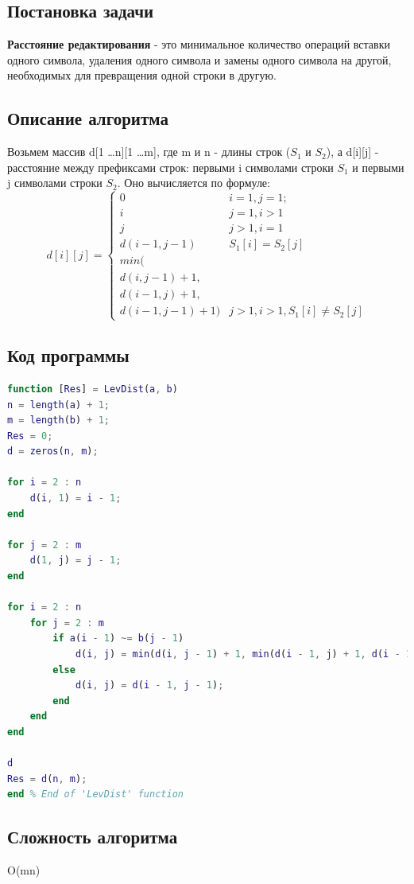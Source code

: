 \documentclass{article}
\begin{document}
\subsection{Постановка задачи}
\textbf{Расстояние редактирования} - это минимальное количество операций вставки одного символа, удаления одного символа и замены одного символа на другой, необходимых для превращения одной строки в другую.
\subsection{Описание алгоритма}
Возьмем массив d[1 \ldots n][1 \ldots m], где m и n - длины строк ($S_{1}$ и $S_{2}$), а d[i][j] - расстояние между префиксами строк: первыми i символами строки $S_{1}$ и первыми j символами строки $S_{2}$. Оно вычисляется по формуле:
\begin{equation}
d[i][j] = 
\begin{cases}
0 & i = 1, j = 1;\\
i & j = 1, i > 1\\
j & j > 1, i = 1\\
d(i - 1, j - 1) & S_{1}[i] = S_{2}[j]\\
min(\\d(i, j - 1) + 1,\\ d(i - 1, j) + 1,\\ d(i - 1, j - 1) + 1) & j > 1, i > 1, S_{1}[i] \neq S_{2}[j]
\end{cases}
\end{equation}
\subsection{Код программы}
\begin{lstlisting}[language={Matlab}, caption={Расстояние редактирования}, label={Script}]
function [Res] = LevDist(a, b)
n = length(a) + 1;
m = length(b) + 1;
Res = 0;
d = zeros(n, m);

for i = 2 : n
	d(i, 1) = i - 1;
end

for j = 2 : m
	d(1, j) = j - 1;
end

for i = 2 : n
	for j = 2 : m
		if a(i - 1) ~= b(j - 1)
			d(i, j) = min(d(i, j - 1) + 1, min(d(i - 1, j) + 1, d(i - 1, j - 1) + 1));
		else
			d(i, j) = d(i - 1, j - 1);
		end
	end
end

d
Res = d(n, m);
end % End of 'LevDist' function
\end{lstlisting}
\subsection{Сложность алгоритма}
O(mn)
\end{document}
